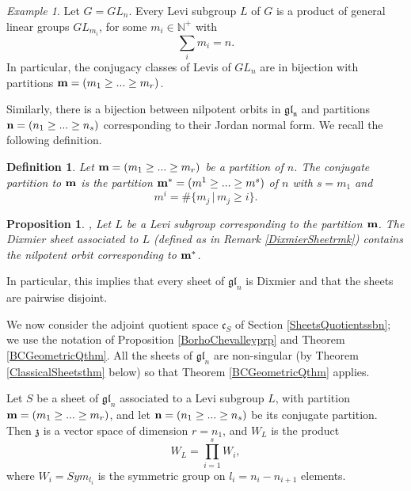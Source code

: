 \documentclass{amsart}
\newtheorem{proposition}[theorem]{Proposition}
\newtheorem{definition}[theorem]{Definition}
\theoremstyle{remark}
\newtheorem{example}[theorem]{Example}
\numberwithin{theorem}{section}
\numberwithin{equation}{section}
\begin{document}
\begin{example}\label{GLnSheetexm}
    Let $G=GL_n$. Every Levi subgroup $L$ of $G$ is a product of general linear groups $GL_{m_i}$, for some $m_i \in \mathbb{N}^+$ with $$\sum_{i}m_i = n.$$
    In particular, the conjugacy classes of Levis of $GL_n$ are in bijection with partitions ${\bf m} =(m_1 \geq ... \geq m_r)$.

    Similarly, there is a bijection between nilpotent orbits in $\mathfrak{gl_n}$ and partitions ${\bf n} = (n_1 \geq ... \geq n_s)$ corresponding to their Jordan normal form. We recall the following definition.

    \begin{definition}\label{ConjPartitiondef}
        Let ${\bf m} = (m_1 \geq ... \geq m_r)$ be a partition of $n$. The \emph{conjugate partition} to ${\bf m}$ is the partition ${\bf m}^* = (m^1 \geq ... \geq m^s)$ of $n$ with $s= m_1$ and
        \begin{equation}
            m^i = \#\{m_j \, | \, m_j \geq i \}.
        \end{equation}
    \end{definition}

    \begin{proposition}\label{GLninductionprp}\cite[Satz 2.2]{Kraft}, \cite[Satz 4.8]{Borho2}
        Let $L$ be a Levi subgroup corresponding to the partition ${\bf m}$. The Dixmier sheet associated to $L$ (defined as in Remark \ref{DixmierSheetrmk}) contains the nilpotent orbit corresponding to ${\bf m}^*$.
    \end{proposition}
In particular, this implies that every sheet of $\mathfrak{gl}_n$ is Dixmier and that the sheets are pairwise disjoint.

We now consider the adjoint quotient space $\mathfrak{c}_S$ of Section \ref{SheetsQuotientssbn}; we use the notation of Proposition \ref{BorhoChevalleyprp} and Theorem \ref{BCGeometricQthm}. All the sheets of $\mathfrak{gl}_n$ are non-singular (by Theorem \ref{ClassicalSheetsthm} below) so that Theorem \ref{BCGeometricQthm} applies. 
    
Let $S$ be a sheet of $\mathfrak{gl}_n$ associated to a Levi subgroup $L$, with partition ${\bf m} = (m_1 \geq ... \geq m_r)$, and let ${\bf n} = (n_1 \geq ... \geq n_s)$ be its conjugate partition. Then $\mathfrak{z}$ is a vector space of dimension $r=n_1$, and $W_L$ is the product 
    $$W_L = \prod_{i=1}^sW_i,$$
    where $W_i=Sym_{l_i}$ is the symmetric group on $l_i=n_i - n_{i+1}$ elements.
    

\end{example}
\end{document}
